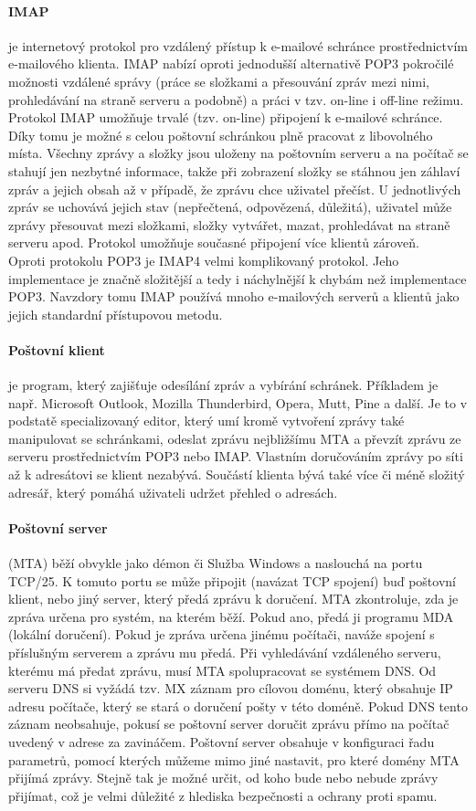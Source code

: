 \documentclass[10pt,a4paper]{article}
\begin{document}
\paragraph{IMAP} je internetový protokol pro vzdálený přístup k e-mailové schránce prostřednictvím e-mailového klienta. IMAP nabízí oproti jednodušší alternativě POP3 pokročilé možnosti vzdálené správy (práce se složkami a přesouvání zpráv mezi nimi, prohledávání na straně serveru a podobně) a práci v tzv. on-line i off-line režimu. Protokol IMAP umožňuje trvalé (tzv. on-line) připojení k e-mailové schránce. Díky tomu je možné s celou poštovní schránkou plně pracovat z libovolného místa. Všechny zprávy a složky jsou uloženy na poštovním serveru a na počítač se stahují jen nezbytné informace, takže při zobrazení složky se stáhnou jen záhlaví zpráv a jejich obsah až v případě, že zprávu chce uživatel přečíst. U jednotlivých zpráv se uchovává jejich stav (nepřečtená, odpovězená, důležitá), uživatel může zprávy přesouvat mezi složkami, složky vytvářet, mazat, prohledávat na straně serveru apod. Protokol umožňuje současné připojení více klientů zároveň. \\
Oproti protokolu POP3 je IMAP4 velmi komplikovaný protokol. Jeho implementace je značně složitější a tedy i náchylnější k chybám než implementace POP3. Navzdory tomu IMAP používá mnoho e-mailových serverů a klientů jako jejich standardní přístupovou metodu.
\paragraph{Poštovní klient} je program, který zajišťuje odesílání zpráv a vybírání schránek. Příkladem je např. Microsoft Outlook, Mozilla Thunderbird, Opera, Mutt, Pine a další. Je to v podstatě specializovaný editor, který umí kromě vytvoření zprávy také manipulovat se schránkami, odeslat zprávu nejbližšímu MTA a převzít zprávu ze serveru prostřednictvím POP3 nebo IMAP. Vlastním doručováním zprávy po síti až k adresátovi se klient nezabývá. Součástí klienta bývá také více či méně složitý adresář, který pomáhá uživateli udržet přehled o adresách.
\paragraph{Poštovní server} (MTA) běží obvykle jako démon či Služba Windows a naslouchá na portu TCP/25. K tomuto portu se může připojit (navázat TCP spojení) buď poštovní klient, nebo jiný server, který předá zprávu k doručení. MTA zkontroluje, zda je zpráva určena pro systém, na kterém běží. Pokud ano, předá ji programu MDA (lokální doručení). Pokud je zpráva určena jinému počítači, naváže spojení s příslušným serverem a zprávu mu předá. Při vyhledávání vzdáleného serveru, kterému má předat zprávu, musí MTA spolupracovat se systémem DNS. Od serveru DNS si vyžádá tzv. MX záznam pro cílovou doménu, který obsahuje IP adresu počítače, který se stará o doručení pošty v této doméně. Pokud DNS tento záznam neobsahuje, pokusí se poštovní server doručit zprávu přímo na počítač uvedený v adrese za zavináčem. Poštovní server obsahuje v konfiguraci řadu parametrů, pomocí kterých můžeme mimo jiné nastavit, pro které domény MTA přijímá zprávy. Stejně tak je možné určit, od koho bude nebo nebude zprávy přijímat, což je velmi důležité z hlediska bezpečnosti a ochrany proti spamu.
\end{document}
